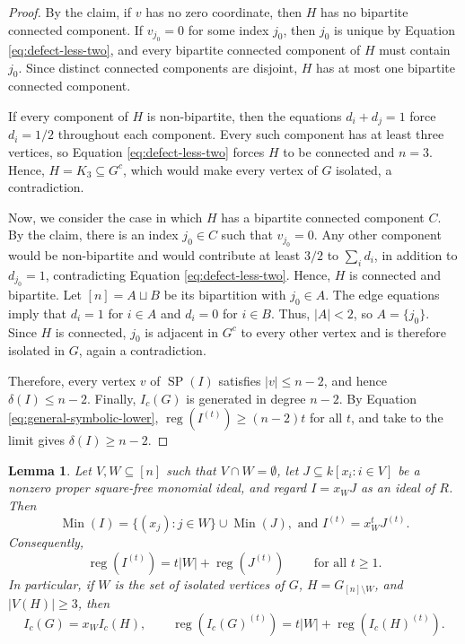 \documentclass[12pt]{amsart}
\newtheorem{lemma}[proposition]{Lemma}
\DeclareMathOperator{\reg}{reg}
\DeclareMathOperator{\Min}{Min}
\begin{document}
\begin{proof}
\medskip

By the claim, if \(v\) has no zero coordinate, then \(H\) has no
bipartite connected component. If \(v_{j_0}=0\) for some index
\(j_0\), then \(j_0\) is unique by Equation \eqref{eq:defect-less-two}, and
every bipartite connected component of \(H\) must contain \(j_0\).
Since distinct connected components are disjoint, \(H\) has at most
one bipartite connected component.

If every component of $H$ is non-bipartite, then the equations $d_i+d_j=1$ force $d_i=1/2$ throughout each component. Every such component has at least three vertices, so Equation \eqref{eq:defect-less-two} forces $H$ to be connected and $n=3$. Hence, $H=K_3\subseteq G^c$, which would make every vertex of $G$ isolated, a contradiction.

Now, we consider the case in which \(H\) has a bipartite
connected component \(C\). By the claim, there is an index \(j_0\in C\)
such that \(v_{j_0}=0\). Any other component would be non-bipartite and would contribute at least $3/2$ to $\sum_i d_i$, in addition to $d_{j_0}=1$, contradicting Equation \eqref{eq:defect-less-two}. Hence, $H$ is connected and bipartite. Let $[n]=A\sqcup B$ be its bipartition with $j_0\in A$. The edge equations imply that  $d_i=1$ for $i\in A$ and $d_i=0$ for $i\in B$. Thus, $|A|<2$, so $A=\{j_0\}$. Since $H$ is connected, $j_0$ is adjacent in $G^c$ to every other vertex and is therefore isolated in $G$, again a contradiction. 

Therefore, every vertex $v$ of $\operatorname{SP}(I)$ satisfies $|v|\le n-2$, and hence $\delta(I)\le n-2$. Finally, $I_c(G)$ is generated in degree $n-2$. By Equation \eqref{eq:general-symbolic-lower}, $\reg(I^{(t)}) \ge (n-2)t$ for all $t$, and take to the limit gives $\delta(I)\ge n-2$.
\end{proof}

\begin{lemma}\label{lem:isolated-reduction}
Let $V,W\subseteq[n]$ such that $V \cap W=\emptyset$, let $J\subseteq k[x_i:i\in V]$ be a nonzero proper square-free monomial ideal, and regard $I=x_WJ$ as an ideal of $R$. Then
\[
\Min(I)=\{(x_j):j\in W\}\cup\Min(J), \text{ and } I^{(t)}=x_W^tJ^{(t)}.
\]
Consequently,
\[
\reg(I^{(t)})=t|W|+\reg(J^{(t)}) \qquad \text{ for all } t\ge1.
\]
In particular, if $W$ is the set of isolated vertices of $G$, $H=G_{[n]\setminus W}$, and $|V(H)|\ge3$, then
\begin{equation}\label{eq:isolated-reduction}
I_c(G)=x_WI_c(H),
\qquad
\reg(I_c(G)^{(t)})=t|W|+\reg(I_c(H)^{(t)}).
\end{equation}
\end{lemma}
\end{document}
